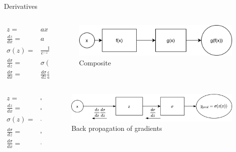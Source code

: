 \begin{frame}{Derivatives}
	\begin{columns}
		\begin{column}{.5\textwidth}
			\begin{align}
				z=&ax+b \\
				\frac{dz}{dx} =& a \\
				\sigma(z) =&\frac{1}{e^{-z}+1} \\
				\frac{d\sigma}{dz} =& \sigma(z)(1-\sigma(z)) \\
				\frac{d\sigma}{dx}=&\frac{d\sigma}{dz} \frac{dz}{dx} 
			\end{align}
		\end{column}
		\begin{column}{.5\textwidth}
			\begin{figure}
				\includegraphics[width=.8\textwidth, center]{figures/function_composition}
				\caption*{Composite}
			\end{figure}
		\end{column}
	\end{columns}
\end{frame}


\begin{frame}{}
	\begin{columns}
		\begin{column}{.5\textwidth}
			\begin{align}
				z=&ax+b \\
				\frac{dz}{dx} =& a \\
				\sigma(z) =&\frac{1}{e^{-z}+1} \\
				\frac{d\sigma}{dz} =& \sigma(z)(1-\sigma(z)) \\
				\frac{d\sigma}{dx}=&\frac{d\sigma}{dz} \frac{dz}{dx}=\frac{dz}{dx} \frac{d\sigma}{dz}  
			\end{align}
		\end{column}
		\begin{column}{.5\textwidth}
			\begin{figure}
				\includegraphics[width=.8\textwidth, center]{figures/function_composition_sigma}
				\caption*{Back propagation of gradients}
			\end{figure}
		\end{column}
	\end{columns}
\end{frame}